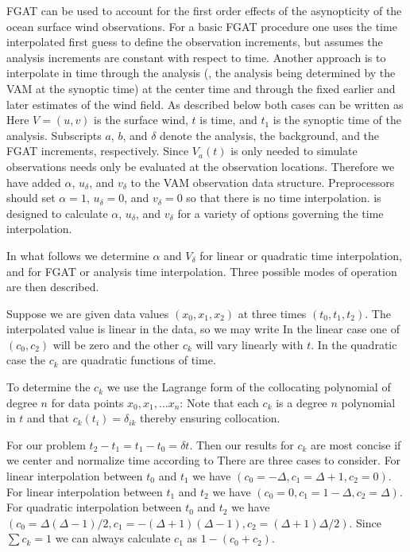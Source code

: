 \documentclass[12pt,titlepage]{article}
\begin{document}
FGAT can be used to account for the first order effects of the
asynopticity of the ocean surface wind observations.
For a basic FGAT procedure one uses the time interpolated first guess
to define the observation increments, but assumes the analysis
increments are constant with respect to time.
Another approach is to interpolate in time through the analysis (\ie,
the analysis being determined by the VAM at the synoptic time) at the
center time and through the fixed earlier and later estimates of the
wind field.
As described below both cases can be written as
Here $V = (u,v)$ is the surface wind, $t$ is time, and $t_1$ is the
synoptic time of the analysis.
Subscripts $a$, $b$, and $\delta$ denote the analysis, the
background, and the FGAT increments, respectively.
Since $V_a(t)$ is only needed to simulate observations 
needs only be evaluated at the observation locations.
Therefore we have added $\alpha$, $u_{\delta}$, and $v_{\delta}$ to
the VAM observation data structure.
Preprocessors should  set  $\alpha=1$, $u_{\delta}=0$, and
$v_{\delta}=0$ so that there is no time interpolation.
 is designed to calculate $\alpha$, $u_{\delta}$, and
$v_{\delta}$ for a variety of options governing the time
interpolation.

In what follows we determine $\alpha$ and $V_{\delta}$ for linear or
quadratic time interpolation, and for FGAT or analysis time
interpolation.
Three possible modes of operation are then described.


Suppose we are given data values $(x_0, x_1, x_2)$ at three times
$(t_0, t_1, t_2)$.
The interpolated value is linear in the data, so we may write
In the linear case one of $(c_0, c_2)$ will be zero and the
other $c_k$ will vary linearly with $t$.
In the quadratic case the $c_k$ are quadratic functions of time.

To determine the $c_k$ we use the Lagrange form of the collocating
polynomial of degree $n$ for data points  $x_0, x_1, \ldots x_n$:
Note that each $c_k$ is a degree $n$ polynomial in $t$ and that
$c_k(t_i) = \delta_{ik}$ thereby ensuring collocation.

For our problem $t_2 - t_1 = t_1 - t_0 = \delta t$.
Then our results for $c_k$ are most concise if we center and normalize
time according to 
There are three cases to consider.
For linear interpolation between $t_0$ and $t_1$ we have $(c_0 =
-\Delta, c_1 = \Delta + 1, c_2 = 0)$.
For linear interpolation between $t_1$ and $t_2$ we have $(c_0 = 0, c_1
= 1 - \Delta, c_2 = \Delta)$.
For quadratic interpolation between $t_0$ and $t_2$ we have $(c_0 =
\Delta(\Delta - 1)/2, c_1 = -(\Delta + 1)(\Delta - 1), c_2 = (\Delta +
1)\Delta/2)$.
Since $\sum c_k = 1$ we can always calculate $c_1$ as $1-(c_0 + c_2)$.
\end{document}
